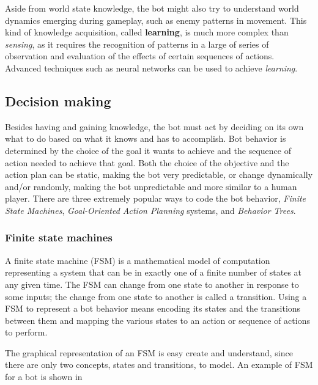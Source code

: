 Aside from world state knowledge, the bot might also try to understand world dynamics emerging during gameplay, such as enemy patterns in movement. This kind of knowledge acquisition, called \textbf{learning}, is much more complex than \textit{sensing}, as it requires the recognition of patterns in a large of series of observation and evaluation of the effects of certain sequences of actions. Advanced techniques such as neural networks can be used to achieve \textit{learning}. 

\subsection{Decision making} \label{subsection:theory_decision_making}
Besides having and gaining knowledge, the bot must act by deciding on its own what to do based on what it knows and has to accomplish.
Bot behavior is determined by the choice of the goal it wants to achieve and the sequence of action needed to achieve that goal. 
Both the choice of the objective and the action plan can be static, making the bot very predictable, or change dynamically and/or randomly, making the bot unpredictable and more similar to a human player.
There are three extremely popular ways to code the bot behavior, \textit{Finite State Machines}, \textit{Goal-Oriented Action Planning} systems, and \textit{Behavior Trees}.

\subsubsection{Finite state machines}

A finite state machine (FSM) is a mathematical model of computation representing a system that can be in exactly one of a finite number of states at any given time. The FSM can change from one state to another in response to some inputs; the change from one state to another is called a transition. Using a FSM to represent a bot behavior means encoding its states and the transitions between them and mapping the various states to an action or sequence of actions to perform.

The graphical representation of an FSM is easy create and understand, since there are only two concepts, states and transitions, to model. An example of FSM for a bot is shown in 

